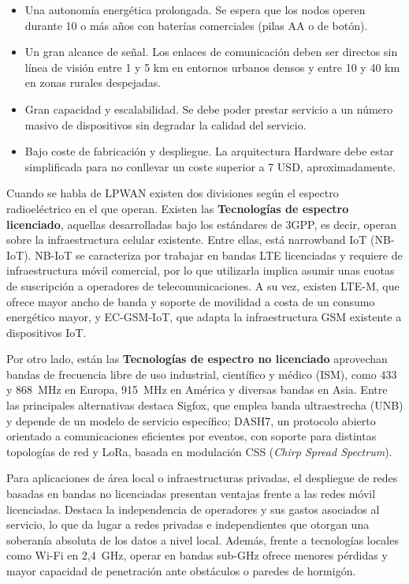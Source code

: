 \begin{itemize}
    \item Una autonomía energética prolongada. Se espera que los nodos operen durante 10 o más años con baterías comerciales (pilas AA o de botón).
    
    \item Un gran alcance de señal. Los enlaces de comunicación deben ser directos sin línea de visión entre 1 y 5 km en entornos urbanos densos y entre 10 y 40 km en zonas rurales despejadas.

    \item Gran capacidad y escalabilidad. Se debe poder prestar servicio a un número masivo de dispositivos sin degradar la calidad del servicio.

    \item Bajo coste de fabricación y despliegue. La arquitectura Hardware debe estar simplificada para no conllevar un coste superior a 7 USD, aproximadamente.
\end{itemize}

Cuando se habla de LPWAN existen dos divisiones según el espectro radioeléctrico en el que operan. Existen las \textbf{Tecnologías de espectro licenciado}, aquellas desarrolladas bajo los estándares de 3GPP, es decir, operan sobre la infraestructura celular existente. Entre ellas, está narrowband IoT (NB-IoT). NB-IoT se caracteriza por trabajar en bandas LTE licenciadas y requiere de infraestructura móvil comercial, por lo que utilizarla implica asumir unas cuotas de suscripción a operadores de telecomunicaciones. A su vez, existen LTE-M, que ofrece mayor ancho de banda y soporte de movilidad a costa de un consumo energético mayor, y EC-GSM-IoT, que adapta la infraestructura GSM existente a dispositivos IoT.

Por otro lado, están las \textbf{Tecnologías de espectro no licenciado} aprovechan bandas de frecuencia libre de uso industrial, científico y médico (ISM), como 433 y 868~MHz en Europa, 915~MHz en América y diversas bandas en Asia. Entre las principales alternativas destaca Sigfox, que emplea banda ultraestrecha (UNB) y depende de un modelo de servicio específico; DASH7, un protocolo abierto orientado a comunicaciones eficientes por eventos, con soporte para distintas topologías de red y LoRa, basada en modulación CSS (\textit{Chirp Spread Spectrum}).

Para aplicaciones de área local o infraestructuras privadas, el despliegue de redes basadas en bandas no licenciadas presentan ventajas frente a las redes móvil licenciadas. Destaca la independencia de operadores y sus gastos asociados al servicio, lo que da lugar a redes privadas e independientes que otorgan una soberanía absoluta de los datos a nivel local. Además, frente a tecnologías locales como Wi-Fi en 2,4~GHz, operar en bandas sub-GHz ofrece menores pérdidas y mayor capacidad de penetración ante obstáculos o paredes de hormigón.

